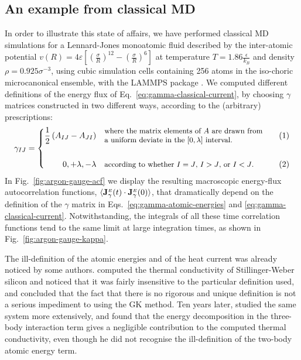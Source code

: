 \subsection{An example from classical MD}
In order to illustrate this state of affairs, we have performed classical MD simulations for a Lennard-Jones monoatomic fluid described by the inter-atomic potential $v(R) = 4\varepsilon \left[ \left( \frac{\sigma}{R}\right)^{12} - \left(\frac{\sigma}{R} \right)^{6} \right]$ at temperature $T=1.86 \frac{\epsilon}{k_B}$ and density $\rho=0.925 \sigma^{-3}$, using cubic simulation cells containing 256 atoms in the iso-choric microcanonical ensemble, with the LAMMPS package \cite{LAMMPS1995}. 
We computed different definitions of the energy flux of Eq.~\eqref{eq:gamma-classical-current}, by choosing $\gamma$ matrices constructed in two different ways, according to the (arbitrary) prescriptions:
\begin{equation}
\setbox0=\vbox{\hsize=68mm \small\noindent where the matrix
      elements of $A$ are drawn from a uniform deviate  in the
      $[0,\lambda]$ interval.}
\setbox1 \vbox{\hsize=68mm \small\noindent according to whether $I=J$,
  $I>J$, or $I<J$.}
\gamma_{IJ}= \left \{
  \begin{alignedat}{2}
    \frac{1}{2} \left(A_{IJ}-A_{JI}\right ) & \quad\raise -0.3\ht0
    \box0 && \qquad (1) \\
\\
    0, +\lambda, -\lambda & \quad \box1 && \qquad (2) \\
  \end{alignedat} \right .
\label{eq:gamma-definitions}
\end{equation}
In Fig.~\ref{fig:argon-gauge-acf} we display the resulting macroscopic energy-flux autocorrelation functions, $\langle \mathbf{J}_{\gamma}^{{\scriptscriptstyle E}}(t) \cdot \mathbf{J}_{\gamma}^{{\scriptscriptstyle E}}(0) \rangle$, that dramatically depend on the definition of the $\gamma$ matrix in Eqs.~\eqref{eq:gamma-atomic-energies} and \eqref{eq:gamma-classical-current}.  Notwithstanding, the integrals of all these time correlation functions tend to the same limit at large integration times, as shown in Fig.~\ref{fig:argon-gauge-kappa}.

The ill-definition of the atomic energies and of the heat current was already noticed by some authors. \citet{Schelling2002} computed the thermal conductivity of Stillinger-Weber \cite{Stillinger1985} silicon and noticed that it was fairly insensitive to the particular definition used, and concluded that the fact that there is no rigorous and unique definition is not a serious impediment to using the GK method. Ten years later, \citet{Howell2012} studied the same system more extensively, and found that the energy decomposition in the three-body interaction term gives a negligible contribution to the computed thermal conductivity, even though he did not recognise the ill-definition of the two-body atomic energy term.

